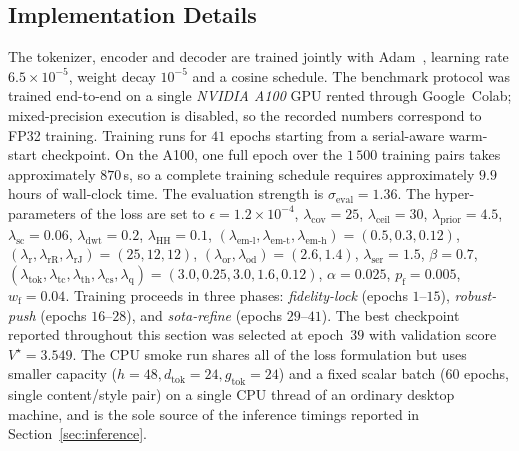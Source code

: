 \documentclass[conference]{IEEEtran}
\begin{document}
\subsection{Implementation Details}
\label{sec:impl}
The tokenizer, encoder and decoder are trained jointly with Adam~\cite{adam}, learning rate $6.5\!\times\!10^{-5}$, weight decay $10^{-5}$ and a cosine schedule. The benchmark protocol was trained end-to-end on a single \emph{NVIDIA A100} GPU rented through Google~Colab; mixed-precision execution is disabled, so the recorded numbers correspond to FP32 training. Training runs for $41$ epochs starting from a serial-aware warm-start checkpoint. On the A100, one full epoch over the $1\,500$ training pairs takes approximately $870$\,s, so a complete training schedule requires approximately $9.9$ hours of wall-clock time. The evaluation strength is $\sigma_{\text{eval}}=1.36$. The hyper-parameters of the loss are set to $\epsilon\!=\!1.2\!\times\!10^{-4}$, $\lambda_{\text{cov}}\!=\!25$, $\lambda_{\text{ceil}}\!=\!30$, $\lambda_{\text{prior}}\!=\!4.5$, $\lambda_{\text{sc}}\!=\!0.06$, $\lambda_{\text{dwt}}\!=\!0.2$, $\lambda_{\text{HH}}\!=\!0.1$, $(\lambda_{\text{em-l}},\lambda_{\text{em-t}},\lambda_{\text{em-h}})\!=\!(0.5,0.3,0.12)$, $(\lambda_{\text{r}},\lambda_{\text{rR}},\lambda_{\text{rJ}})\!=\!(25,12,12)$, $(\lambda_{\text{or}},\lambda_{\text{od}})\!=\!(2.6,1.4)$, $\lambda_{\text{ser}}\!=\!1.5$, $\beta\!=\!0.7$, $(\lambda_{\text{tok}},\lambda_{\text{tc}},\lambda_{\text{th}},\lambda_{\text{cs}},\lambda_{\text{q}})\!=\!(3.0,0.25,3.0,1.6,0.12)$, $\alpha\!=\!0.025$, $p_{\text{f}}\!=\!0.005$, $w_{\text{f}}\!=\!0.04$. Training proceeds in three phases: \emph{fidelity-lock} (epochs $1$--$15$), \emph{robust-push} (epochs $16$--$28$), and \emph{sota-refine} (epochs $29$--$41$). The best checkpoint reported throughout this section was selected at epoch~$39$ with validation score $V^{\star}\!=\!3.549$. The CPU smoke run shares all of the loss formulation but uses smaller capacity ($h\!=\!48,d_{\text{tok}}\!=\!24,g_{\text{tok}}\!=\!24$) and a fixed scalar batch ($60$ epochs, single content/style pair) on a single CPU thread of an ordinary desktop machine, and is the sole source of the inference timings reported in Section~\ref{sec:inference}.
\end{document}
